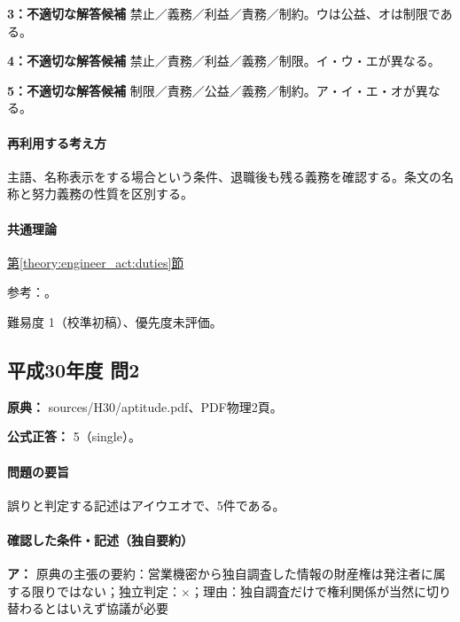 \noindent\textbf{3：不適切な解答候補} 禁止／義務／利益／責務／制約。ウは公益、オは制限である。\par

\noindent\textbf{4：不適切な解答候補} 禁止／責務／利益／義務／制限。イ・ウ・エが異なる。\par

\noindent\textbf{5：不適切な解答候補} 制限／責務／公益／義務／制約。ア・イ・エ・オが異なる。\par

\paragraph{再利用する考え方} 主語、名称表示をする場合という条件、退職後も残る義務を確認する。条文の名称と努力義務の性質を区別する。

\paragraph{共通理論} \hyperref[theory:engineer_act:duties]{第\ref*{theory:engineer_act:duties}節}

\par 参考：\cite{engineer_act_current}。

\par 難易度 1（校準初稿）、優先度未評価。

\subsection{平成30年度 問2}
\label{q:h30-reg-apt-02}

\noindent\textbf{原典：} sources/H30/aptitude.pdf、PDF物理2頁。

\textbf{公式正答：} 5（single）。

\paragraph{問題の要旨} 誤りと判定する記述はアイウエオで、5件である。

\paragraph{確認した条件・記述（独自要約）}\mbox{}\par

\noindent\textbf{ア：} 原典の主張の要約：営業機密から独自調査した情報の財産権は発注者に属する限りではない；独立判定：×；理由：独自調査だけで権利関係が当然に切り替わるとはいえず協議が必要\par

